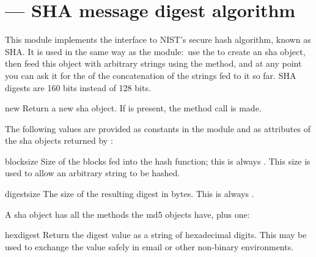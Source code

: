 \section{ ---
         SHA message digest algorithm}



This module implements the interface to NIST's secure hash 
algorithm, known as SHA.  It is used in
the same way as the  module:\ use the 
to create an sha object, then feed this object with arbitrary strings
using the  method, and at any point you can ask it
for the  of the concatenation of the strings fed to it
so far.  SHA digests are 160 bits instead of 128
bits.


\begin{funcdesc}{new}{}
  Return a new sha object.  If  is present, the method
  call  is made.
\end{funcdesc}


The following values are provided as constants in the module and as
attributes of the sha objects returned by :

\begin{datadesc}{blocksize}
  Size of the blocks fed into the hash function; this is always
  .  This size is used to allow an arbitrary string to be
  hashed.
\end{datadesc}

\begin{datadesc}{digestsize}
  The size of the resulting digest in bytes.  This is always
  .
\end{datadesc}


A sha object has all the methods the md5 objects have, plus one:

\begin{methoddesc}[sha]{hexdigest}{}
  Return the digest value as a string of hexadecimal digits.  This may 
  be used to exchange the value safely in email or other non-binary
  environments.
\end{methoddesc}


\begin{seealso}
\end{seealso}
